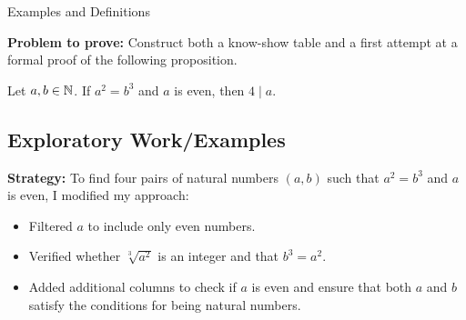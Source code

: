 {Examples and Definitions}

\textbf{Problem to prove:} Construct both a know-show table and a first attempt at a formal proof of the following proposition.

\begin{prop}
    Let \( a, b \in \mathbb{N} \). If \( a^2 = b^3 \) and \( a \) is even, then \( 4 \mid a \).
\end{prop}

\subsection{Exploratory Work/Examples}

\textbf{Strategy:} 
To find four pairs of natural numbers \( (a, b) \) such that \( a^2 = b^3 \) and \( a \) is even, I modified my approach:
\begin{itemize}
    \item Filtered \( a \) to include only even numbers.
    \item Verified whether \( \sqrt[3]{a^2} \) is an integer and that \( b^3 = a^2 \).
    \item Added additional columns to check if \( a \) is even and ensure that both \( a \) and \( b \) satisfy the conditions for being natural numbers.
\end{itemize}

